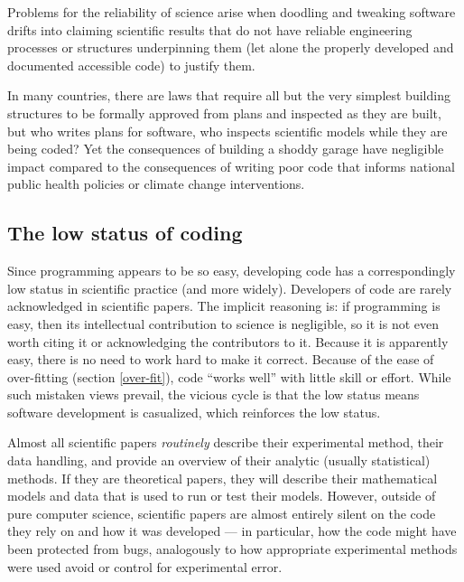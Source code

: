 \documentclass{comjnl}
\begin{document}
Problems for the reliability of science arise when doodling and tweaking software drifts into claiming scientific results that do not have reliable engineering processes or structures underpinning them (let alone the properly developed and documented accessible code) to justify them. 

In many countries, there are laws that require all but the very simplest building structures to be formally approved from plans and inspected as they are built, but who writes plans for software, who inspects scientific models while they are being coded? Yet the consequences of building a shoddy garage have negligible impact compared to the consequences of writing poor code that informs national public health policies or climate change interventions.

\subsection{The low status of coding}\label{lowCodeStatus}
Since programming appears to be so easy, developing code has a correspondingly low status in scientific practice (and more widely). Developers of code are rarely acknowledged in scientific papers. The implicit reasoning is: if programming is easy, then its intellectual contribution to science is negligible, so it is not even worth citing it or acknowledging the contributors to it. Because it is apparently easy, there is no need to work hard to make it correct. Because of the ease of over-fitting (section \ref{over-fit}), code ``works well'' with little skill or effort. While such mistaken views prevail, the vicious cycle is that the low status means software development is casualized, which reinforces the low status.

Almost all scientific papers \emph{routinely\/} describe their experimental method, their data handling, and provide an overview of their analytic (usually statistical) methods. If they are theoretical papers, they will describe their mathematical models and data that is used to run or test their models. However, outside of pure computer science, scientific papers are almost entirely silent on the code they rely on and how it was developed --- in particular, how the code might have been protected from bugs, analogously to how appropriate experimental methods were used avoid or control for experimental error. 

\end{document}

